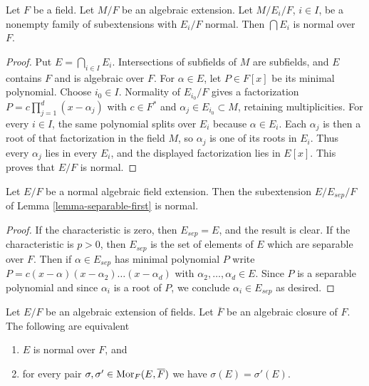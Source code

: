 \begin{lemma}
\label{lemma-intersect-normal}
Let $F$ be a field. Let $M/F$ be an algebraic extension. Let
$M/E_i/F$, $i \in I$, be a nonempty family of subextensions with
$E_i/F$ normal. Then $\bigcap E_i$ is normal over $F$.
\end{lemma}

\begin{proof}
Put $E = \bigcap_{i \in I} E_i$. Intersections of subfields of $M$
are subfields, and $E$ contains $F$ and is algebraic over $F$.
For $\alpha \in E$, let $P \in F[x]$ be its minimal polynomial.
Choose $i_0 \in I$. Normality of $E_{i_0}/F$ gives a factorization
$P = c\prod_{j=1}^d(x-\alpha_j)$ with $c \in F^*$ and
$\alpha_j \in E_{i_0} \subset M$, retaining multiplicities.
For every $i \in I$, the same polynomial splits over $E_i$ because
$\alpha \in E_i$. Each $\alpha_j$ is then a root of that factorization
in the field $M$, so $\alpha_j$ is one of its roots in $E_i$.
Thus every $\alpha_j$ lies in every $E_i$, and the displayed
factorization lies in $E[x]$. This proves that $E/F$ is normal.
\end{proof}

\begin{lemma}
\label{lemma-separable-first-normal}
Let $E/F$ be a normal algebraic field extension. Then the subextension
$E/E_{sep}/F$ of Lemma \ref{lemma-separable-first} is normal.
\end{lemma}

\begin{proof}
If the characteristic is zero, then $E_{sep} = E$, and the result
is clear. If the characteristic is $p > 0$, then $E_{sep}$
is the set of elements of $E$ which are separable over $F$.
Then if $\alpha \in E_{sep}$ has minimal polynomial $P$
write $P = c(x - \alpha)(x - \alpha_2) \ldots (x - \alpha_d)$
with $\alpha_2, \ldots, \alpha_d \in E$. Since
$P$ is a separable polynomial and since $\alpha_i$
is a root of $P$, we conclude $\alpha_i \in E_{sep}$ as desired.
\end{proof}

\begin{lemma}
\label{lemma-characterize-normal}
Let $E/F$ be an algebraic extension of fields. Let $\overline{F}$ be an
algebraic closure of $F$. The following are equivalent
\begin{enumerate}
\item $E$ is normal over $F$, and
\item for every pair $\sigma, \sigma' \in \mathop{\mathrm{Mor}}\nolimits_F(E, \overline{F})$ we
have $\sigma(E) = \sigma'(E)$.
\end{enumerate}
\end{lemma}

